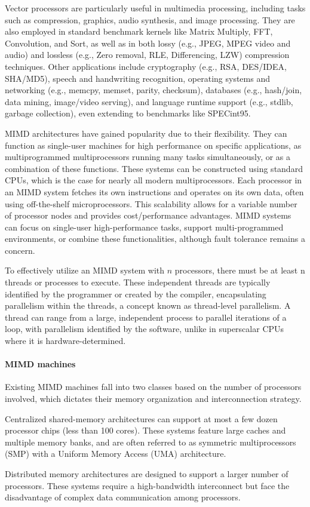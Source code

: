 Vector processors are particularly useful in multimedia processing, including tasks such as compression, graphics, audio synthesis, and image processing. 
They are also employed in standard benchmark kernels like Matrix Multiply, FFT, Convolution, and Sort, as well as in both lossy (e.g., JPEG, MPEG video and audio) and lossless (e.g., Zero removal, RLE, Differencing, LZW) compression techniques. Other applications include cryptography (e.g., RSA, DES/IDEA, SHA/MD5), speech and handwriting recognition, operating systems and networking (e.g., memcpy, memset, parity, checksum), databases (e.g., hash/join, data mining, image/video serving), and language runtime support (e.g., stdlib, garbage collection), even extending to benchmarks like SPECint95.

MIMD architectures have gained popularity due to their flexibility. 
They can function as single-user machines for high performance on specific applications, as multiprogrammed multiprocessors running many tasks simultaneously, or as a combination of these functions. 
These systems can be constructed using standard CPUs, which is the case for nearly all modern multiprocessors. 
Each processor in an MIMD system fetches its own instructions and operates on its own data, often using off-the-shelf microprocessors. 
This scalability allows for a variable number of processor nodes and provides cost/performance advantages. 
MIMD systems can focus on single-user high-performance tasks, support multi-programmed environments, or combine these functionalities, although fault tolerance remains a concern.

To effectively utilize an MIMD system with $n$ processors, there must be at least n threads or processes to execute. 
These independent threads are typically identified by the programmer or created by the compiler, encapsulating parallelism within the threads, a concept known as thread-level parallelism. 
A thread can range from a large, independent process to parallel iterations of a loop, with parallelism identified by the software, unlike in superscalar CPUs where it is hardware-determined.

\paragraph*{MIMD machines}
Existing MIMD machines fall into two classes based on the number of processors involved, which dictates their memory organization and interconnection strategy.

Centralized shared-memory architectures can support at most a few dozen processor chips (less than 100 cores). 
These systems feature large caches and multiple memory banks, and are often referred to as symmetric multiprocessors (SMP) with a Uniform Memory Access (UMA) architecture.

Distributed memory architectures are designed to support a larger number of processors. 
These systems require a high-bandwidth interconnect but face the disadvantage of complex data communication among processors.
